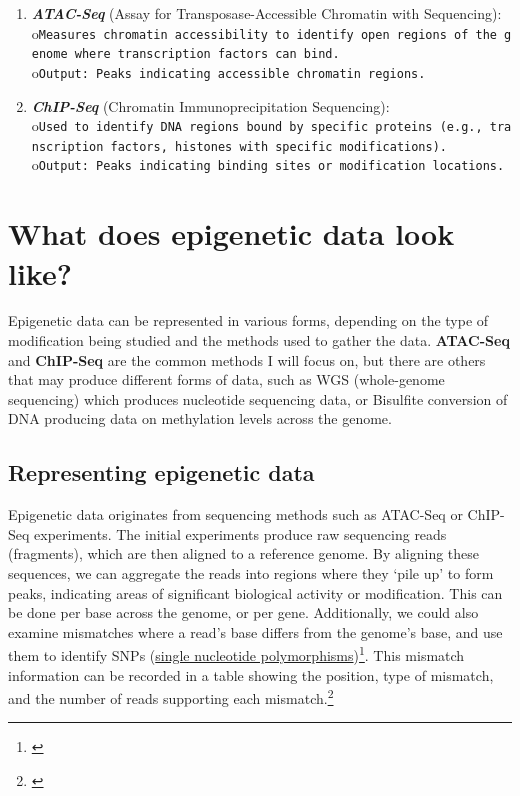 \documentclass[
]{book}
\begin{document}
\begin{enumerate}
\def\labelenumi{\arabic{enumi}.}
\item
  \textbf{\emph{ATAC-Seq}} (Assay for Transposase-Accessible Chromatin with Sequencing):
  o\texttt{Measures\ chromatin\ accessibility\ to\ identify\ open\ regions\ of\ the\ genome\ where\ transcription\ factors\ can\ bind.}
  o\texttt{Output:\ Peaks\ indicating\ accessible\ chromatin\ regions.}
\item
  \textbf{\emph{ChIP-Seq}} (Chromatin Immunoprecipitation Sequencing):
  o\texttt{Used\ to\ identify\ DNA\ regions\ bound\ by\ specific\ proteins\ (e.g.,\ transcription\ factors,\ histones\ with\ specific\ modifications).}
  o\texttt{Output:\ Peaks\ indicating\ binding\ sites\ or\ modification\ locations.}
\end{enumerate}

\section{What does epigenetic data look like?}\label{what-does-epigenetic-data-look-like}

Epigenetic data can be represented in various forms, depending on the type of modification being studied and the methods used to gather the data. \textbf{ATAC-Seq} and \textbf{ChIP-Seq} are the common methods I will focus on, but there are others that may produce different forms of data, such as WGS (whole-genome sequencing) which produces nucleotide sequencing data, or Bisulfite conversion of DNA producing data on methylation levels across the genome.

\subsection{Representing epigenetic data}\label{representing-epigenetic-data}

Epigenetic data originates from sequencing methods such as ATAC-Seq or ChIP-Seq experiments. The initial experiments produce raw sequencing reads (fragments), which are then aligned to a reference genome. By aligning these sequences, we can aggregate the reads into regions where they `pile up' to form peaks, indicating areas of significant biological activity or modification. This can be done per base across the genome, or per gene. Additionally, we could also examine mismatches where a read's base differs from the genome's base, and use them to identify SNPs (\href{https://www.cancer.gov/publications/dictionaries/genetics-dictionary/def/single-nucleotide-polymorphism}{single nucleotide polymorphisms})\footnote{\citet{ncidefinitions}}. This mismatch information can be recorded in a table showing the position, type of mismatch, and the number of reads supporting each mismatch.\footnote{\citet{akalin2020}}
\end{document}
